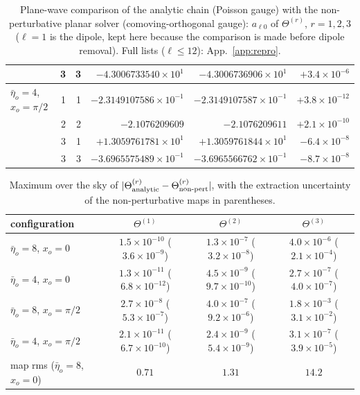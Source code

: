 \begin{table}[t]
\begin{tabular}{@{}lrr rrr@{}}
 & 3 & 3 & $-4.3006733540\times10^{1}$ & $-4.3006736906\times10^{1}$ & $+3.4\times10^{-6}$\\ \hline
$\bar\eta_o=4$, $x_o=\pi/2$ & 1 & 1 & $-2.3149107586\times10^{-1}$ & $-2.3149107587\times10^{-1}$ & $+3.8\times10^{-12}$\\
 & 2 & 2 & $-2.1076209609$ & $-2.1076209611$ & $+2.1\times10^{-10}$\\
 & 3 & 1 & $+1.3059761781\times10^{1}$ & $+1.3059761844\times10^{1}$ & $-6.4\times10^{-8}$\\
 & 3 & 3 & $-3.6965575489\times10^{-1}$ & $-3.6965566762\times10^{-1}$ & $-8.7\times10^{-8}$\\ \hline
\end{tabular}
\caption{Plane-wave comparison of the analytic chain (Poisson gauge) with the non-perturbative planar solver (comoving-orthogonal
gauge): $a_{\ell0}$ of $\Theta^{(r)}$, $r=1,2,3$ ($\ell=1$ is the dipole, kept here because the comparison is made before dipole removal).
Full lists ($\ell\le12$): App.~\ref{app:repro}.}
\label{tab:a1n1}
\end{table}

\begin{table}[t]
\centering\footnotesize\setlength{\tabcolsep}{4pt}
\begin{tabular}{@{}lccc@{}}
\hline
configuration & $\Theta^{(1)}$ & $\Theta^{(2)}$ & $\Theta^{(3)}$\\ \hline
$\bar\eta_o=8$, $x_o=0$ & $1.5\times10^{-10}$ ($3.6\times10^{-9}$) & $1.3\times10^{-7}$ ($3.2\times10^{-8}$) & $4.0\times10^{-6}$ ($2.1\times10^{-4}$)\\
$\bar\eta_o=4$, $x_o=0$ & $1.3\times10^{-11}$ ($6.8\times10^{-12}$) & $4.5\times10^{-9}$ ($9.7\times10^{-10}$) & $2.7\times10^{-7}$ ($4.0\times10^{-7}$)\\
$\bar\eta_o=8$, $x_o=\pi/2$ & $2.7\times10^{-8}$ ($5.3\times10^{-7}$) & $4.0\times10^{-7}$ ($9.2\times10^{-6}$) & $1.8\times10^{-3}$ ($3.1\times10^{-2}$)\\
$\bar\eta_o=4$, $x_o=\pi/2$ & $2.1\times10^{-11}$ ($6.7\times10^{-10}$) & $2.4\times10^{-9}$ ($5.4\times10^{-9}$) & $3.1\times10^{-7}$ ($3.9\times10^{-5}$)\\ \hline
map rms ($\bar\eta_o=8$, $x_o=0$) & $0.71$ & $1.31$ & $14.2$\\ \hline
\end{tabular}
\caption{Maximum over the sky of $|\Theta^{(r)}_{\rm analytic}-\Theta^{(r)}_{\rm non\text{-}pert}|$, with the extraction uncertainty of the
non-perturbative maps in parentheses.}
\label{tab:a1n1maps}
\end{table}

